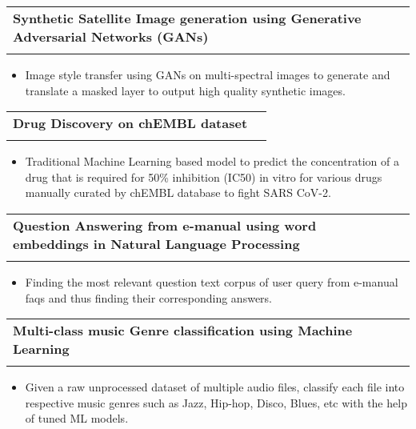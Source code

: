 \documentclass[a4paper,11pt]{article}
\makeatletter
\newcommand{\resumeProject}[4]{
\vspace{0.4mm}
\item
    \begin{tabular*}{0.98\textwidth}[t]{l@{\extracolsep{\fill}}r}
        \textbf{#1} & \textit{\footnotesize{#3}} \\
        \footnotesize{\textit{#2}} & \footnotesize{#4}
    \end{tabular*}
    \vspace{-2.4mm}
}
\newcommand{\resumeItemListStart}{\begin{justify}\begin{itemize}[leftmargin=3ex, rightmargin=2ex, noitemsep,labelsep=1.2mm,itemsep=0mm]\small}
\newcommand{\resumeItemListEnd}{\end{itemize}\end{justify}\vspace{-2mm}}
\makeatother
\begin{document}
    \resumeProject
      {Synthetic Satellite Image generation using Generative Adversarial Networks (GANs)}{}      {\textnormal{\href{https://github.com/Nusart/synthetic-satellite-imagery-GANs}{\Large \faGithub}}}{} %
      \vspace{-5.5mm}
      \resumeItemListStart
        \item {Image style transfer using GANs on multi-spectral images to generate and translate a masked layer to output high quality synthetic images.}
    \resumeItemListEnd
    \resumeProject
      {Drug Discovery on chEMBL dataset}{}      {\textnormal{\href{https://github.com/Nusart/drug-discovery-chembl}{\Large \faGithub}}}{}
      \vspace{-5.5mm}
      \resumeItemListStart
        \item {Traditional Machine Learning based model to predict the concentration of a drug that is required for 50\% inhibition (IC50) in vitro for various drugs manually curated by chEMBL database to fight SARS CoV-2.}
    \resumeItemListEnd

    
    \resumeProject
      {Question Answering from e-manual using word embeddings in Natural Language Processing}{}    {\textnormal{\href{https://github.com/Nusart/question-answering-NLP}{\Large \faGithub}}}{}
      \vspace{-5.5mm}
      \resumeItemListStart
        \item {Finding the most relevant question text corpus of user query from e-manual faqs and thus finding their corresponding answers.}
    \resumeItemListEnd
    
    \resumeProject
      {Multi-class music Genre classification using Machine Learning}
      {}     {\textnormal{\href{https://github.com/Nusart/music-genre-classification}{\Large \faGithub}}}{}
      \vspace{-5.5mm}
      \resumeItemListStart
        \item {Given a raw unprocessed dataset of multiple audio files, classify each file into respective music genres such as Jazz, Hip-hop, Disco, Blues, etc with the help of tuned ML models.}
    \resumeItemListEnd
    
\end{document}
